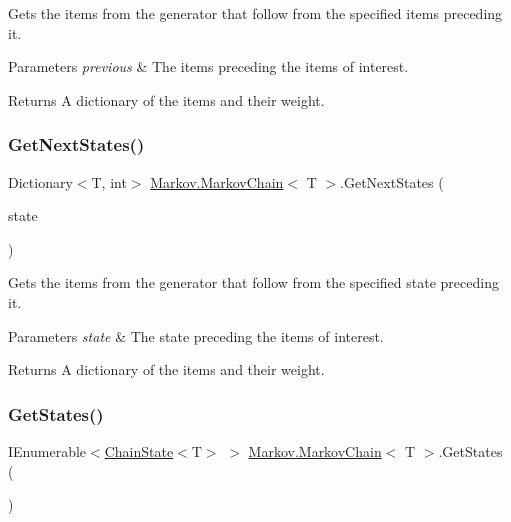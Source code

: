 Gets the items from the generator that follow from the specified items preceding it. 


\begin{DoxyParams}{Parameters}
{\em previous} & The items preceding the items of interest.\\
\hline
\end{DoxyParams}
\begin{DoxyReturn}{Returns}
A dictionary of the items and their weight.
\end{DoxyReturn}
\mbox{\label{class_markov_1_1_markov_chain_a124133e485b50cae03d205b5fcffcdb1}} 
\subsubsection{\texorpdfstring{Get\+Next\+States()}{GetNextStates()}\hspace{0.1cm}{\footnotesize\ttfamily [2/2]}}
{\footnotesize\ttfamily Dictionary$<$T, int$>$ \mbox{\hyperlink{class_markov_1_1_markov_chain}{Markov.\+Markov\+Chain}}$<$ T $>$.Get\+Next\+States (\begin{DoxyParamCaption}\item[{\mbox{\hyperlink{class_markov_1_1_chain_state}{Chain\+State}}$<$ T $>$}]{state }\end{DoxyParamCaption})}



Gets the items from the generator that follow from the specified state preceding it. 


\begin{DoxyParams}{Parameters}
{\em state} & The state preceding the items of interest.\\
\hline
\end{DoxyParams}
\begin{DoxyReturn}{Returns}
A dictionary of the items and their weight.
\end{DoxyReturn}
\mbox{\label{class_markov_1_1_markov_chain_a5875741ce2c4fb9cb3d2242cac166167}} 
\subsubsection{\texorpdfstring{Get\+States()}{GetStates()}}
{\footnotesize\ttfamily I\+Enumerable$<$\mbox{\hyperlink{class_markov_1_1_chain_state}{Chain\+State}}$<$T$>$ $>$ \mbox{\hyperlink{class_markov_1_1_markov_chain}{Markov.\+Markov\+Chain}}$<$ T $>$.Get\+States (\begin{DoxyParamCaption}{ }\end{DoxyParamCaption})}



